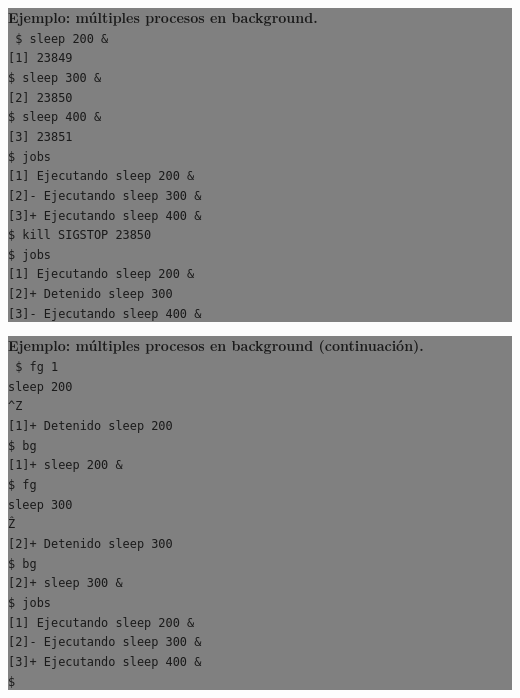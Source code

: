 \documentclass[12pt]{article}
\begin{document}
\colorbox{grey}{\parbox[t]{0.95\linewidth}{ \vspace*{0.5cm} { 
{\bf Ejemplo: múltiples procesos en background. }\\
{\tt
\$ sleep 200 \& \\
{[}1{]} 23849 \\
\$ sleep 300 \& \\
{[}2{]} 23850\\
\$ sleep 400 \& \\
{[}3{]} 23851 \\
\$ jobs \\
{[}1{]}   Ejecutando              sleep 200 \& \\
{[}2{]}-  Ejecutando              sleep 300 \& \\
{[}3{]}+  Ejecutando              sleep 400 \& \\
\$ kill \-SIGSTOP 23850 \\
\$ jobs \\
{[}1{]}   Ejecutando              sleep 200 \& \\
{[}2{]}+  Detenido                sleep 300 \\
{[}3{]}-  Ejecutando              sleep 400 \& \\
}
} \vspace*{0.5cm} } } 


\colorbox{grey}{\parbox[t]{0.95\linewidth}{ \vspace*{0.5cm} { 
{\bf Ejemplo: múltiples procesos en background (continuación). }\\
{\tt
\$ fg 1 \\
sleep 200 \\
\texttt{\^}Z \\
{[}1{]}+  Detenido                sleep 200 \\
\$ bg \\
{[}1{]}+ sleep 200 \& \\
\$ fg \\
sleep 300 \\
\^Z\\
{[}2{]}+  Detenido                sleep 300 \\
\$ bg \\
{[}2{]}+ sleep 300 \& \\
\$ jobs\\
{[}1{]}   Ejecutando              sleep 200 \& \\
{[}2{]}-  Ejecutando              sleep 300 \& \\
{[}3{]}+  Ejecutando              sleep 400 \& \\
\$ \\
}
} \vspace*{0.5cm} } } 
\end{document}
